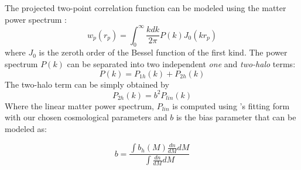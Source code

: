\documentclass[useAMS,usenatbib]{mn2e}
\begin{document}
The projected two-point correlation function can be modeled using the matter 
power spectrum \citep[see, e.g., ][]{cs02}:
\begin{equation}
w_{p}(r_p) = \int^{\infty}_{0} \frac{k dk}{2\pi} P(k) J_0(k r_p)
\end{equation}
where $J_0$ is the zeroth order of the Bessel function of the first kind. The power spectrum $P(k)$ can be separated into two independent {\it one} and {\it two-halo} terms: 
\begin{equation}
  P(k) = P_{1h}(k)+P_{2h}(k)
\end{equation}
The two-halo term can be simply obtained by  
\begin{equation}
P_{2h}(k) = b^2 P_{lin}(k)
\end{equation}
Where the linear matter power spectrum, $P_{lin}$ is computed using 
\citet{eh99}'s fitting form with our chosen cosmological parameters and $b$ is 
the bias parameter that can be modeled as:

\begin{equation}
b = \frac{\int b_h(M) \frac{dn}{dM} dM}{\int \frac{dn}{dM} dM}
\end{equation}
\end{document}
